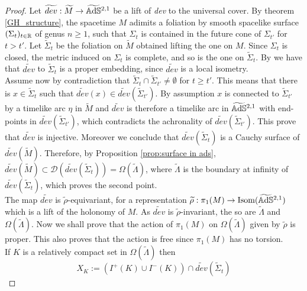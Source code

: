\begin{proof}
    Let $\widetilde{dev}: \widetilde{M} \to \widetilde{\mathbb{A}\mathrm{d}\mathbb{S}}{}^{2,1}$ be a lift of \textit{dev} to the universal cover. By theorem \ref{GH_structure}, the spacetime $M$ adimits a foliation by smooth spacelike surface $(\Sigma_t)_{t\in\mathbb{R}}$ of genus $n\geq 1$, such that $\Sigma_t$ is contained in the future cone of $\Sigma_{t'}$ for $t > t'$. Let $\widetilde{\Sigma}_t$ be the foliation on $\widetilde{M}$ obtained lifting the one on $M$. Since $\Sigma_t$ is closed, the metric induced on $\Sigma_t$ is complete, and so is the one on $\widetilde{\Sigma}_t$. By  we have that $\widetilde{dev}$ to $\widetilde{\Sigma}_t$ is a proper embedding, since $\widetilde{dev}$ is a local isometry.\\
    Assume now by contradiction that $\widetilde{\Sigma}_t \cap \widetilde{\Sigma}_{t'} \neq \emptyset$ for $t \geq t'$. This means that there is $x \in \widetilde{\Sigma}_t$ such that $\widetilde{dev}(x) \in \widetilde{dev}(\widetilde{\Sigma}_{t'})$. By assumption $x$ is connected to $\widetilde{\Sigma}_{t'}$ by a timelike arc $\eta$ in $\widetilde{M}$ and $\widetilde{dev}$ is therefore a timelike arc in $\widetilde{\mathbb{A}\mathrm{d}\mathbb{S}}{}^{2,1}$ with end-points in $\widetilde{dev}(\widetilde{\Sigma}_{t'})$, which contradicts the achronality of $\widetilde{dev}(\widetilde{\Sigma}_{t'})$. This prove that $\widetilde{dev}$ is injective. Moreover we conclude that $\widetilde{dev}(\widetilde{\Sigma}_t)$ is a Cauchy surface of $\widetilde{dev}(\widetilde{M})$. Therefore, by Proposition \ref{prop:surface in ads}, $\widetilde{dev}(\widetilde{M}) \subset \mathcal{D}(\widetilde{dev}(\widetilde{\Sigma}_t)) = \Omega(\widetilde{\Lambda})$, where $\widetilde{\Lambda}$ is the boundary at infinity of $\widetilde{dev}(\widetilde{\Sigma}_t)$, which proves the second point.\\
    The map $\widetilde{dev}$ is $\widetilde{\rho}$-equivariant, for a representation $\widetilde{\rho} : \pi_1(M) \to \text{Isom}(\widetilde{\mathbb{A}\mathrm{d}\mathbb{S}}{}^{2,1})$ which is a lift of the holonomy of $M$. As $\widetilde{dev}$ is $\widetilde{\rho}$-invariant, the so are $\widetilde{\Lambda}$ and $\Omega(\widetilde{\Lambda})$. Now we shall prove that the action of $\pi_1(M)$ on $\Omega(\widetilde{\Lambda})$ given by $\widetilde{\rho}$ is proper. This also proves that the action is free since $\pi_1(M)$ has no torsion.\\
    If $K$ is a relatively compact set in $\Omega(\widetilde{\Lambda})$ then
    \[
        X_K := (I^+(K) \cup I^-(K)) \cap \widetilde{dev}(\widetilde{\Sigma}_t)
\]
\end{proof}
